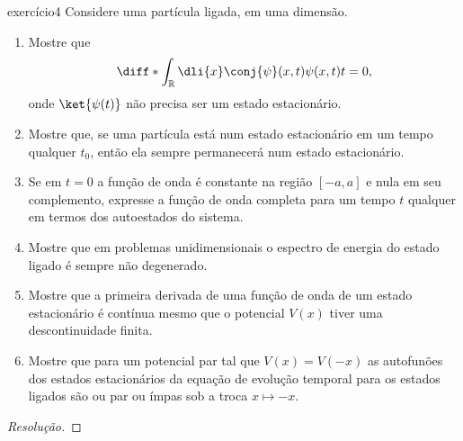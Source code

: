 \begin{exercício}{}{exercício4}
    Considere uma partícula ligada, em uma dimensão.
    \begin{enumerate}[label=(\alph*)]
        \item Mostre que
            \begin{equation*}
                \diff*{\int_{\mathbb{R}}\dli{x}\conj{\psi}(x,t)\psi(x,t)}{t} = 0,
            \end{equation*}
            onde \(\ket{\psi(t)}\) não precisa ser um estado estacionário.
        \item Mostre que, se uma partícula está num estado estacionário em um tempo qualquer \(t_0\), então ela sempre permanecerá num estado estacionário.
        \item Se em \(t = 0\) a função de onda é constante na região \([-a,a]\) e nula em seu complemento, expresse a função de onda completa para um tempo \(t\) qualquer em termos dos autoestados do sistema.
        \item Mostre que em problemas unidimensionais o espectro de energia do estado ligado é sempre não degenerado.
        \item Mostre que a primeira derivada de uma função de onda de um estado estacionário é contínua mesmo que o potencial \(V(x)\) tiver uma descontinuidade finita.
        \item Mostre que para um potencial par tal que \(V(x) = V(-x)\) as autofunões dos estados estacionários da equação de evolução temporal para os estados ligados são ou par ou ímpas sob a troca \(x \mapsto -x\).
    \end{enumerate}
\end{exercício}
\begin{proof}[Resolução]

\end{proof}
